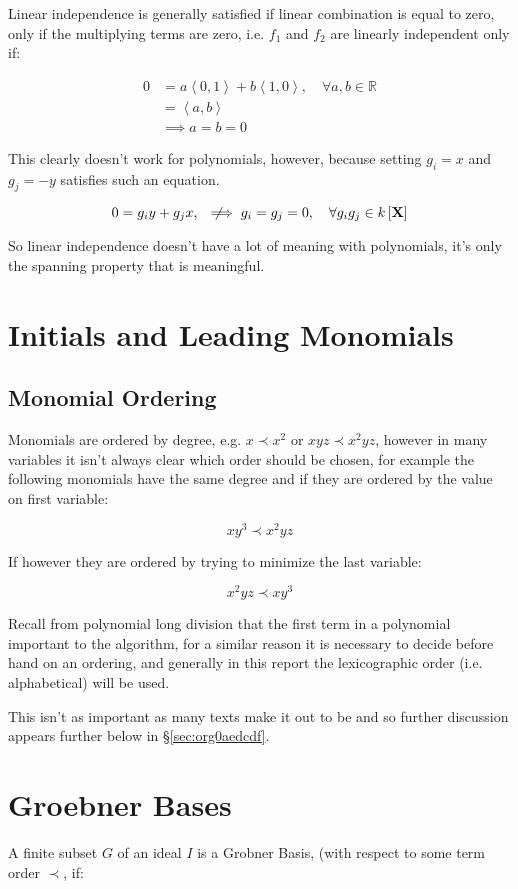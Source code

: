 \documentclass[a4paper,11pt,twoside]{article}
\begin{document}
Linear independence is generally satisfied if linear
combination is equal to zero, only if the multiplying terms are
zero, i.e. \(f_1\) and \(f_2\) are linearly independent only if:


$$\begin{aligned}
  0 & =a\left\langle 0,1\right\rangle +b\left\langle 1,0\right\rangle ,\quad\forall a,b\in\mathbb{R}\\
  & =\left\langle a,b\right\rangle \\
  & \implies a=b=0\end{aligned}$$    


This clearly doesn't work for polynomials, however, because setting \(g_{i}=x\) and
\(g_{j}=-y\) satisfies such an equation.

$$0=g_{i}y+g_{j}x,\quad\not\!\!\!\implies g_i=g_j=0, \quad \forall g_{i}g_{j}\in
    k\left[\mathbf{X}\right] $$


So linear independence doesn't have a lot of meaning with polynomials, 
it's only the spanning property that is meaningful.
\section{Initials and Leading Monomials}
\label{sec:orgd2449a1}
\subsection{Monomial Ordering}
\label{sec:org91c53e4}
Monomials are ordered by degree, e.g. \(x \prec x^2\) or \(xyz
   \prec x^2yz\), however in many variables it isn't always clear
which order should be chosen, for example the following monomials
have the same degree and if they are ordered by the value on first variable:

\[
   xy^3 \prec x^2yz 
   \]

If however they are ordered by trying to minimize the last
variable:

\[
   x^2yz \prec xy^3
   \]

Recall from polynomial long division that the first term in a
polynomial important to the algorithm, for a similar reason it is
necessary to decide before hand on an ordering, and generally in
this report the lexicographic order (i.e. alphabetical) will be
used.

This isn't as important as many texts make it out to be and so
further discussion appears further below in \S \ref{sec:org0aedcdf}.
\section{Groebner Bases}
\label{sec:orga94fcba}
A finite subset \(G\) of an ideal \(I\) is a Grobner Basis, (with
respect to some term order \(\prec\), if: \cite{berndsturmfelsIntroductionGrobnerBases2017a,hibiGrobnerBasesStatistics2014}
\end{document}
